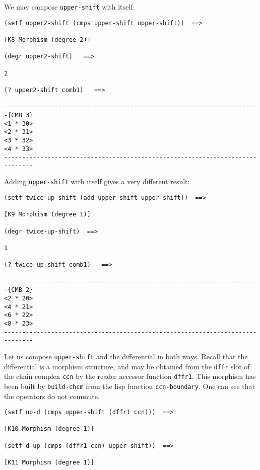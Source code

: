 We may compose {\tt upper-shift} with itself:
{\footnotesize\begin{verbatim}
(setf upper2-shift (cmps upper-shift upper-shift))  ==>

[K8 Morphism (degree 2)]

(degr upper2-shift)   ==>

2

(? upper2-shift comb1)   ==>

-----------------------------------------------------------------------{CMB 3}
<1 * 30>
<2 * 31>
<3 * 32>
<4 * 33>
------------------------------------------------------------------------------
\end{verbatim}}
Adding {\tt upper-shift} with itself gives a very different result:
{\footnotesize\begin{verbatim}
(setf twice-up-shift (add upper-shift upper-shift))  ==>

[K9 Morphism (degree 1)]

(degr twice-up-shift)  ==>

1

(? twice-up-shift comb1)   ==>

-----------------------------------------------------------------------{CMB 2}
<2 * 20>
<4 * 21>
<6 * 22>
<8 * 23>
------------------------------------------------------------------------------
\end{verbatim}}
Let us compose {\tt upper-shift} and the differential in both ways.
Recall that the differential is a morphism structure, and
may be obtained from the {\tt dffr} slot  of the chain complex {\tt ccn} 
by the reader accessor function {\tt dffr1}. This morphism has
been built by {\tt build-chcm} from the lisp function {\tt ccn-boundary}. One can
see that the operators do not commute.
{\footnotesize\begin{verbatim}
(setf up-d (cmps upper-shift (dffr1 ccn)))  ==>

[K10 Morphism (degree 1)]

(setf d-up (cmps (dffr1 ccn) upper-shift))  ==>

[K11 Morphism (degree 1)]
\end{verbatim}}
\newpage
